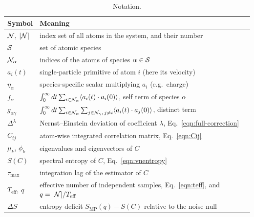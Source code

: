 \begin{table}[tbp]
    \centering
    \small
    \begin{tabular}{@{}lp{}@{}}
        \toprule
        Symbol & Meaning \\ \midrule
        $\mathcal{N}$, $|\mathcal{N}|$ & index set of all atoms in the system, and their number \\
        $\mathcal{S}$ & set of atomic species \\
        $\mathcal{N}_{\alpha}$ & indices of the atoms of species $\alpha \in \mathcal{S}$ \\
        $a_{i}(t)$ & single-particle primitive of atom $i$ (here its velocity) \\
        $\eta_{\alpha}$ & species-specific scalar multiplying $a_{i}$ (e.g.\ charge) \\
        $f_{\alpha}$ & $\int_{0}^{\infty} dt \sum_{i \in \mathcal{N}_{\alpha}} \langle a_{i}(t) \cdot a_{i}(0) \rangle$, self term of species $\alpha$ \\
        $g_{\alpha\gamma}$ & $\int_{0}^{\infty} dt \sum_{i \in \mathcal{N}_{\alpha}} \sum_{j \in \mathcal{N}_{\gamma},\, j \neq i} \langle a_{i}(t) \cdot a_{j}(0) \rangle$, distinct term \\
        $\Delta^{\lambda}$ & Nernst--Einstein deviation of coefficient $\lambda$, Eq.~\eqref{eqn:full-correction} \\
        $C_{ij}$ & atom-wise integrated correlation matrix, Eq.~\eqref{eqn:Cij} \\
        $\mu_{k}$, $\phi_{k}$ & eigenvalues and eigenvectors of $C$ \\
        $S(C)$ & spectral entropy of $C$, Eq.~\eqref{eqn:vnentropy} \\
        $\tau_{\max}$ & integration lag of the estimator of $C$ \\
        $T_{\text{eff}}$, $q$ & effective number of independent samples, Eq.~\eqref{eqn:teff}, and $q = |\mathcal{N}|/T_{\text{eff}}$ \\
        $\Delta S$ & entropy deficit $S_{\text{MP}}(q) - S(C)$ relative to the noise null \\ \bottomrule
    \end{tabular}
    \caption{Notation.}
    \label{tab:definitions}
\end{table}
